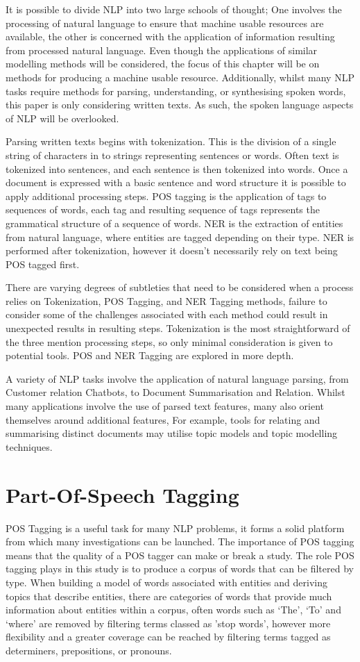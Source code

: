\documentclass[10pt]{report}
\begin{document}
It is possible to divide NLP into two large schools of thought; One involves the processing of natural language to ensure that machine usable resources are available, the other is concerned with the application of information resulting from processed natural language. Even though the applications of similar modelling methods will be considered, the focus of this chapter will be on methods for producing a machine usable resource. Additionally, whilst many NLP tasks require methods for parsing, understanding, or synthesising spoken words, this paper is only considering written texts. As such, the spoken language aspects of NLP will be overlooked.

Parsing written texts begins with tokenization. This is the division of a single string of characters in to strings representing sentences or words. Often text is tokenized into sentences, and each sentence is then tokenized into words. Once a document is expressed with a basic sentence and word structure it is possible to apply additional processing steps. POS tagging is the application of tags to sequences of words, each tag and resulting sequence of tags represents the grammatical structure of a sequence of words. NER is the extraction of entities from natural language, where entities are tagged depending on their type. NER is performed after tokenization, however it doesn’t necessarily rely on text being POS tagged first.

There are varying degrees of subtleties that need to be considered when a process relies on Tokenization, POS Tagging, and NER Tagging methods, failure to consider some of the challenges associated with each method could result in unexpected results in resulting steps. Tokenization is the most straightforward of the three mention processing steps, so only minimal consideration is given to potential tools. POS and NER Tagging are explored in more depth.

A variety of NLP tasks involve the application of natural language parsing, from Customer relation Chatbots, to Document Summarisation and Relation. Whilst many applications involve the use of parsed text features, many also orient themselves around additional features, For example, tools for relating and summarising distinct documents may utilise topic models and topic modelling techniques.


\section{Part-Of-Speech Tagging}
POS Tagging is a useful task for many NLP problems, it forms a solid platform from which many investigations can be launched. The importance of POS tagging means that the quality of a POS tagger can make or break a study. The role POS tagging plays in this study is to produce a corpus of words that can be filtered by type. When building a model of words associated with entities and deriving topics that describe entities, there are categories of words that provide much information about entities within a corpus, often words such as ‘The’, ‘To’ and ‘where’ are removed by filtering terms classed as 'stop words', however more flexibility and a greater coverage can be reached by filtering terms tagged as determiners, prepositions, or pronouns.
\end{document}
